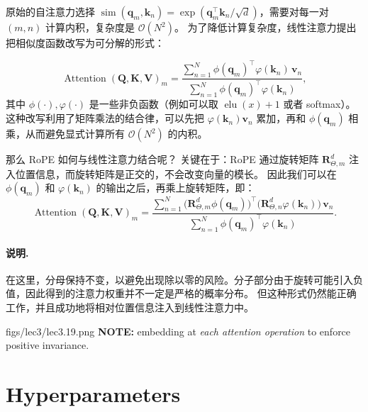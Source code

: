 原始的自注意力选择 $\operatorname{sim}(\mathbf{q}_m,\mathbf{k}_n)=\exp(\mathbf{q}_m^\top \mathbf{k}_n / \sqrt{d})$，需要对每一对 $(m,n)$ 计算内积，复杂度是 $\mathcal{O}(N^2)$。  
为了降低计算复杂度，线性注意力提出把相似度函数改写为可分解的形式：

\begin{equation}
	\operatorname{Attention}(\mathbf{Q},\mathbf{K},\mathbf{V})_m
	= \frac{\sum_{n=1}^{N}\phi(\mathbf{q}_m)^\top \varphi(\mathbf{k}_n)\,\mathbf{v}_n}
	{\sum_{n=1}^{N}\phi(\mathbf{q}_m)^\top \varphi(\mathbf{k}_n)},
	\label{fn:linear-attention}
\end{equation}
其中 $\phi(\cdot),\varphi(\cdot)$ 是一些非负函数（例如可以取 $\operatorname{elu}(x)+1$ 或者 softmax）。  
这种改写利用了矩阵乘法的结合律，可以先把 $\varphi(\mathbf{k}_n)\mathbf{v}_n$ 累加，再和 $\phi(\mathbf{q}_m)$ 相乘，从而避免显式计算所有 $\mathcal{O}(N^2)$ 的内积。

\medskip
那么 RoPE 如何与线性注意力结合呢？  
关键在于：RoPE 通过旋转矩阵 $\mathbf{R}^d_{\Theta,m}$ 注入位置信息，而旋转矩阵是正交的，不会改变向量的模长。  
因此我们可以在 $\phi(\mathbf{q}_m)$ 和 $\varphi(\mathbf{k}_n)$ 的输出之后，再乘上旋转矩阵，即：
\begin{equation}
	\operatorname{Attention}(\mathbf{Q},\mathbf{K},\mathbf{V})_m
	= \frac{\sum_{n=1}^{N}\big(\mathbf{R}^d_{\Theta,m}\phi(\mathbf{q}_m)\big)^\top
	\big(\mathbf{R}^d_{\Theta,n}\varphi(\mathbf{k}_n)\big)\,\mathbf{v}_n}
	{\sum_{n=1}^{N}\phi(\mathbf{q}_m)^\top \varphi(\mathbf{k}_n)}.
	\label{fn:linear-rope}
\end{equation}

\paragraph{说明.} 
在这里，分母保持不变，以避免出现除以零的风险。分子部分由于旋转可能引入负值，因此得到的注意力权重并不一定是严格的概率分布。  
但这种形式仍然能正确工作，并且成功地将相对位置信息注入到线性注意力中。

\MarginImageWithNote
{figs/lec3/lec3.19.png}
{}
{\textbf{NOTE:} embedding at \textit{each attention operation} to enforce positive invariance.}


\clearpage
{\chaptoc\noindent\begin{minipage}[inner sep=0,outer sep=0]{0.9\linewidth}\section{Hyperparameters}\end{minipage}}
\\


